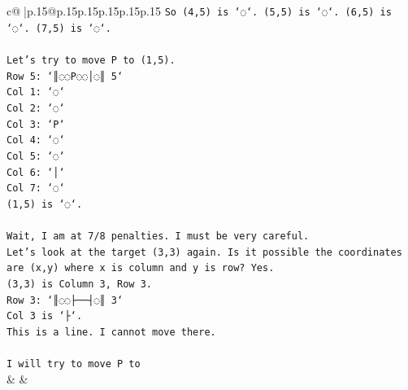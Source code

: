 \documentclass{article}
\begin{document}
{\begin{supertabular}{c@{$\;$}|p{.15\linewidth}@{}p{.15\linewidth}p{.15\linewidth}p{.15\linewidth}p{.15\linewidth}p{.15\linewidth}}
{{{\texttt{So (4,5) is `◌`. (5,5) is `◌`. (6,5) is `◌`. (7,5) is `◌`.} \\
\\ 
\texttt{Let's try to move P to (1,5).} \\
\texttt{Row 5: `║◌◌P◌◌│◌║ 5`} \\
\texttt{Col 1: `◌`} \\
\texttt{Col 2: `◌`} \\
\texttt{Col 3: `P`} \\
\texttt{Col 4: `◌`} \\
\texttt{Col 5: `◌`} \\
\texttt{Col 6: `│`} \\
\texttt{Col 7: `◌`} \\
\texttt{(1,5) is `◌`.} \\
\\ 
\texttt{Wait, I am at 7/8 penalties. I must be very careful.} \\
\texttt{Let's look at the target (3,3) again. Is it possible the coordinates are (x,y) where x is column and y is row? Yes.} \\
\texttt{(3,3) is Column 3, Row 3.} \\
\texttt{Row 3: `║◌◌├──┤◌║ 3`} \\
\texttt{Col 3 is `├`.} \\
\texttt{This is a line. I cannot move there.} \\
\\ 
\texttt{I will try to move P to} \\
            }
        }
    }
    & & \\ \\


\end{supertabular}}
\end{document}
